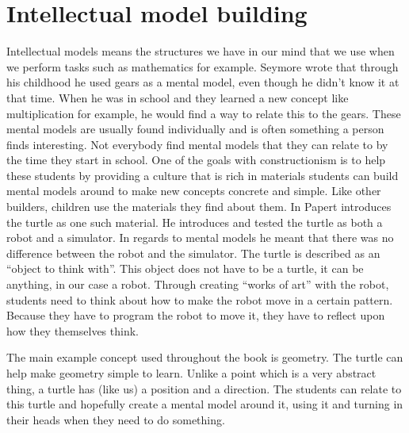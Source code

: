 
\section{Intellectual model building}
Intellectual models means the structures we have in our mind that we use when we perform tasks such as mathematics for example. Seymore wrote that through his childhood he used gears as a mental model, even though he didn't know it at that time. When he was in school and they learned a new concept like multiplication for example, he would find a way to relate this to the gears. These mental models are usually found individually and is often something a person finds interesting. Not everybody find mental models that they can relate to by the time they start in school. One of the goals with constructionism is to help these students by providing a culture that is rich in materials students can build mental models around to make new concepts concrete and simple. Like other builders, children use the materials they find about them. In \cite{papert1980mindstorms} Papert introduces the turtle as one such material. He introduces and tested the turtle as both a robot and a simulator. In regards to mental models he meant that there was no difference between the robot and the simulator. The turtle is described as an ``object to think with''. This object does not have to be a turtle, it can be anything, in our case a robot. Through creating ``works of art'' with the robot, students need to think about how to make the robot move in a certain pattern. Because they have to program the robot to move it, they have to reflect upon how they themselves think. 

\bigskip\noindent
The main example concept used throughout the book is geometry. The turtle can help make geometry simple to learn. Unlike a point which is a very abstract thing, a turtle has (like us) a position and a direction. The students can relate to this turtle and hopefully create a mental model around it, using it and turning in their heads when they need to do something. 

